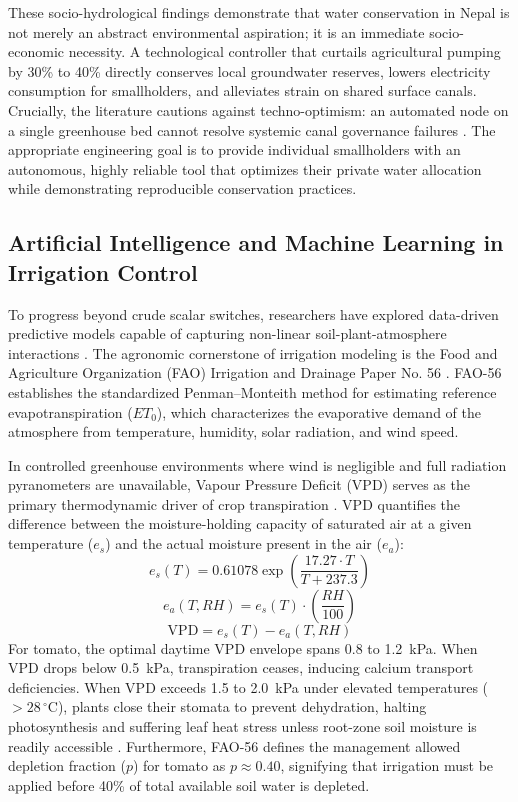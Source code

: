 \documentclass[12pt, a4paper]{article}
\begin{document}
These socio-hydrological findings demonstrate that water conservation in Nepal is not merely an abstract environmental aspiration; it is an immediate socio-economic necessity. A technological controller that curtails agricultural pumping by 30\% to 40\% directly conserves local groundwater reserves, lowers electricity consumption for smallholders, and alleviates strain on shared surface canals. Crucially, the literature cautions against techno-optimism: an automated node on a single greenhouse bed cannot resolve systemic canal governance failures \citep{upadhyay2015}. The appropriate engineering goal is to provide individual smallholders with an autonomous, highly reliable tool that optimizes their private water allocation while demonstrating reproducible conservation practices.

\subsection{Artificial Intelligence and Machine Learning in Irrigation Control}
\label{sec:ml-lit}

To progress beyond crude scalar switches, researchers have explored data-driven predictive models capable of capturing non-linear soil-plant-atmosphere interactions \citep{chen2021}. The agronomic cornerstone of irrigation modeling is the Food and Agriculture Organization (FAO) Irrigation and Drainage Paper No. 56 \citep{allen1998}. FAO-56 establishes the standardized Penman--Monteith method for estimating reference evapotranspiration ($ET_0$), which characterizes the evaporative demand of the atmosphere from temperature, humidity, solar radiation, and wind speed. 

In controlled greenhouse environments where wind is negligible and full radiation pyranometers are unavailable, Vapour Pressure Deficit (VPD) serves as the primary thermodynamic driver of crop transpiration \citep{allen1998}. VPD quantifies the difference between the moisture-holding capacity of saturated air at a given temperature ($e_s$) and the actual moisture present in the air ($e_a$):
\begin{equation}
    e_s(T) = 0.61078 \exp\left(\frac{17.27 \cdot T}{T + 237.3}\right)
\end{equation}
\begin{equation}
    e_a(T, RH) = e_s(T) \cdot \left(\frac{RH}{100}\right)
\end{equation}
\begin{equation}
    \text{VPD} = e_s(T) - e_a(T, RH)
\end{equation}
For tomato, the optimal daytime VPD envelope spans 0.8 to 1.2~kPa. When VPD drops below 0.5~kPa, transpiration ceases, inducing calcium transport deficiencies. When VPD exceeds 1.5 to 2.0~kPa under elevated temperatures ($>28\,^{\circ}$C), plants close their stomata to prevent dehydration, halting photosynthesis and suffering leaf heat stress unless root-zone soil moisture is readily accessible \citep{allen1998}. Furthermore, FAO-56 defines the management allowed depletion fraction ($p$) for tomato as $p \approx 0.40$, signifying that irrigation must be applied before 40\% of total available soil water is depleted.
\end{document}
